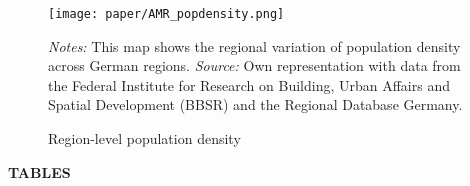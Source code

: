 \documentclass[11pt, a4paper]{article} %
\begin{document}
\vspace*{\fill}
\begin{figure}[H]\centering
	\caption{Region-level population density}\label{fig: AMR_regions_population_density}
	\texttt{[image: paper/AMR\_popdensity.png]}
	\scriptsize
	\begin{minipage}{0.9\linewidth}
		\emph{Notes:} This map shows the regional variation of population density across German regions. \emph{Source:} Own representation with data from the Federal Institute for Research on Building, Urban Affairs and Spatial Development (BBSR) and the Regional Database Germany.
	\end{minipage}
\end{figure}
\vspace*{\fill}\clearpage





\newpage
\vspace*{\fill}
{\Huge \begin{center}\textbf{TABLES}\end{center}}
\vspace*{\fill}\clearpage

\end{document}
